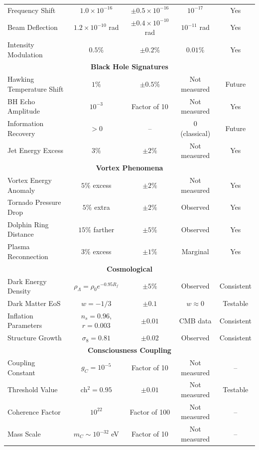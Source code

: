 \documentclass[11pt]{article}
\theoremstyle{definition}
\begin{document}
\begin{center}
\begin{longtable}{|l|c|c|c|c|}
Frequency Shift & $1.0 \times 10^{-16}$ & $\pm 0.5 \times 10^{-16}$ & $10^{-17}$ & Yes \\
Beam Deflection & $1.2 \times 10^{-10}$ rad & $\pm 0.4 \times 10^{-10}$ rad & $10^{-11}$ rad & Yes \\
Intensity Modulation & $0.5\%$ & $\pm 0.2\%$ & $0.01\%$ & Yes \\
\hline
\multicolumn{5}{|c|}{\textbf{Black Hole Signatures}} \\
\hline
Hawking Temperature Shift & $1\%$ & $\pm 0.5\%$ & Not measured & Future \\
BH Echo Amplitude & $10^{-3}$ & Factor of 10 & Not measured & Yes \\
Information Recovery & $> 0$ & -- & 0 (classical) & Future \\
Jet Energy Excess & $3\%$ & $\pm 2\%$ & Not measured & Yes \\
\hline
\multicolumn{5}{|c|}{\textbf{Vortex Phenomena}} \\
\hline
Vortex Energy Anomaly & $5\%$ excess & $\pm 2\%$ & Not measured & Yes \\
Tornado Pressure Drop & $5\%$ extra & $\pm 2\%$ & Observed & Yes \\
Dolphin Ring Distance & $15\%$ farther & $\pm 5\%$ & Observed & Yes \\
Plasma Reconnection & $3\%$ excess & $\pm 1\%$ & Marginal & Yes \\
\hline
\multicolumn{5}{|c|}{\textbf{Cosmological}} \\
\hline
Dark Energy Density & $\rho_\Lambda = \rho_0 e^{-0.95 R_f}$ & $\pm 5\%$ & Observed & Consistent \\
Dark Matter EoS & $w = -1/3$ & $\pm 0.1$ & $w \approx 0$ & Testable \\
Inflation Parameters & $n_s = 0.96$, $r = 0.003$ & $\pm 0.01$ & CMB data & Consistent \\
Structure Growth & $\sigma_8 = 0.81$ & $\pm 0.02$ & Observed & Consistent \\
\hline
\multicolumn{5}{|c|}{\textbf{Consciousness Coupling}} \\
\hline
Coupling Constant & $g_C = 10^{-5}$ & Factor of 10 & Not measured & -- \\
Threshold Value & ch$^2 = 0.95$ & $\pm 0.01$ & Not measured & Testable \\
Coherence Factor & $10^{22}$ & Factor of 100 & Not measured & -- \\
Mass Scale & $m_C \sim 10^{-32}$ eV & Factor of 10 & Not measured & -- \\
\end{longtable}
\end{center}
\end{document}
